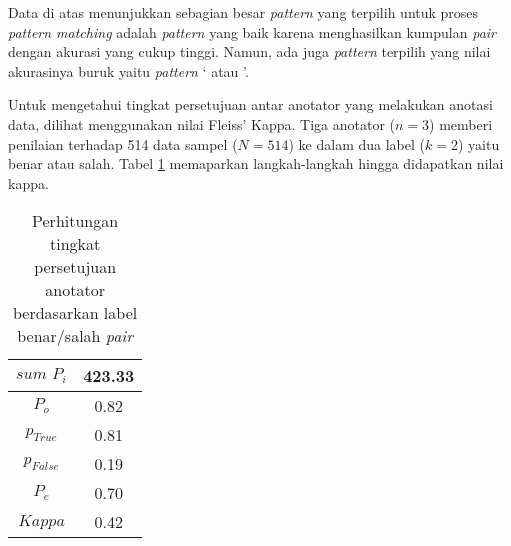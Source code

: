 \begin{table}
  \centering
  \caption{Akurasi \textit{pair} berdasarkan \textit{pattern}}
  \label{table:akurasi-pair-patt}
\end{table}

Data di atas menunjukkan sebagian besar \textit{pattern} yang terpilih untuk proses \textit{pattern matching} adalah \textit{pattern} yang baik karena menghasilkan kumpulan \textit{pair} dengan akurasi yang cukup tinggi. Namun, ada juga \textit{pattern} terpilih yang nilai akurasinya buruk yaitu \textit{pattern} `{\tagHypernym} atau {\tagHyponym}'.

Untuk mengetahui tingkat persetujuan antar anotator yang melakukan anotasi data, dilihat menggunakan nilai Fleiss' Kappa. Tiga anotator ($n=3$) memberi penilaian terhadap 514 data sampel ($N=514$) ke dalam dua label ($k=2$) yaitu benar atau salah. Tabel \ref{table:pair-kappa} memaparkan langkah-langkah hingga didapatkan nilai kappa.

\begin{table}
  \centering
  \caption{Perhitungan tingkat persetujuan anotator berdasarkan label benar/salah \textit{pair}}
  \label{table:pair-kappa}
  \begin{tabular}{|c|c|}
  \hline
  $sum\,\,P_i$ & 423.33 \\ \hline
  $P_o$ & 0.82 \\ \hline
  $p_{True}$ & 0.81 \\ \hline
  $p_{False}$ & 0.19 \\ \hline
  $P_e$ & 0.70 \\ \hline
  $Kappa$ & 0.42 \\ \hline
  \end{tabular} 
\end{table}

